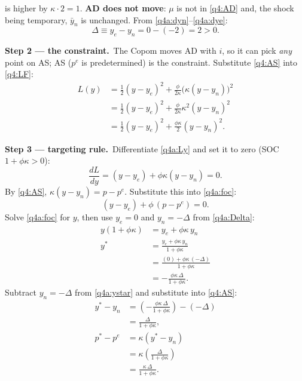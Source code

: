\documentclass[11pt,a4paper]{article}
\newcommand{\passo}[2]{\par\smallskip\noindent\textbf{Step #1.}~#2}
\begin{document}
\begin{sol}
{is higher by $\kappa\cdot2=1$. \textbf{AD does not move}: $\mu$ is not in \eqref{q4:AD} and, the shock being
temporary, $\bar y_n$ is unchanged. From \eqref{q4a:dyn}--\eqref{q4a:dye}:
\begin{equation}
\Delta\equiv y_e-y_n=0-(-2)=2>0. \label{q4a:Delta}
\end{equation}}
\passo{2 --- the constraint}{The Copom moves AD with $i$, so it can pick \emph{any} point on AS; AS ($p^e$ is
predetermined) is the constraint. Substitute \eqref{q4:AS} into \eqref{q4:LF}:
\begin{align}
L(y) &= \tfrac12(y-y_e)^2+\frac{\phi}{2\kappa}\big(\kappa(y-y_n)\big)^2\nonumber\\
&= \tfrac12(y-y_e)^2+\frac{\phi}{2\kappa}\kappa^2(y-y_n)^2\nonumber\\
&= \tfrac12(y-y_e)^2+\frac{\phi\kappa}{2}(y-y_n)^2. \label{q4a:Ly}
\end{align}}
\passo{3 --- targeting rule}{Differentiate \eqref{q4a:Ly} and set it to zero (SOC $1+\phi\kappa>0$):
\begin{equation}
\frac{dL}{dy}=(y-y_e)+\phi\kappa(y-y_n)=0. \label{q4a:foc}
\end{equation}
By \eqref{q4:AS}, $\kappa(y-y_n)=p-p^e$. Substitute this into \eqref{q4a:foc}:
\begin{equation}
\boxed{(y-y_e)+\phi\,(p-p^e)=0}. \label{q4a:rule}
\end{equation}
Solve \eqref{q4a:foc} for $y$, then use $y_e=0$ and $y_n=-\Delta$ from \eqref{q4a:Delta}:
\begin{align}
y(1+\phi\kappa) &= y_e+\phi\kappa\,y_n\nonumber\\
y^* &= \frac{y_e+\phi\kappa\,y_n}{1+\phi\kappa}\nonumber\\
&= \frac{(0)+\phi\kappa\,(-\Delta)}{1+\phi\kappa}\nonumber\\
&= -\frac{\phi\kappa\,\Delta}{1+\phi\kappa}. \label{q4a:ystar}
\end{align}
Subtract $y_n=-\Delta$ from \eqref{q4a:ystar} and substitute into \eqref{q4:AS}:
\begin{align}
y^*-y_n &= \left(-\frac{\phi\kappa\,\Delta}{1+\phi\kappa}\right)-(-\Delta)\nonumber\\
&= \frac{\Delta}{1+\phi\kappa},\nonumber\\
p^*-p^e &= \kappa(y^*-y_n)\nonumber\\
&= \kappa\left(\frac{\Delta}{1+\phi\kappa}\right)\nonumber\\
&= \frac{\kappa\,\Delta}{1+\phi\kappa}. \label{q4a:pstar}
\end{align}
}
\end{sol}
\end{document}
